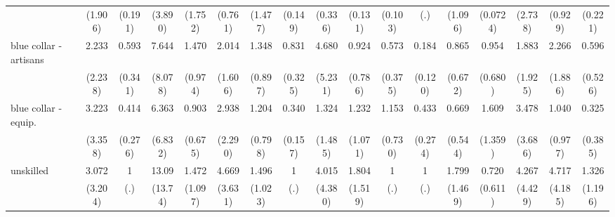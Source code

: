 {\begin{tabular}{l*{16}{c}}
                    &     (1.906)         &     (0.191)         &     (3.890)         &     (1.752)         &     (0.761)         &     (1.477)         &     (0.149)         &     (0.336)         &     (0.131)         &     (0.103)         &         (.)         &     (1.096)         &    (0.0724)         &     (2.738)         &     (0.929)         &     (0.221)         \\
[1em]
blue collar - artisans&       2.233         &       0.593         &       7.644         &       1.470         &       2.014         &       1.348         &       0.831         &       4.680         &       0.924         &       0.573         &       0.184\sym{**} &       0.865         &       0.954         &       1.883         &       2.266         &       0.596         \\
                    &     (2.238)         &     (0.341)         &     (8.078)         &     (0.974)         &     (1.606)         &     (0.897)         &     (0.325)         &     (5.231)         &     (0.786)         &     (0.375)         &     (0.120)         &     (0.672)         &     (0.680)         &     (1.925)         &     (1.886)         &     (0.526)         \\
[1em]
blue collar - equip.&       3.223         &       0.414         &       6.363         &       0.903         &       2.938         &       1.204         &       0.340\sym{*}  &       1.324         &       1.232         &       1.153         &       0.433         &       0.669         &       1.609         &       3.478         &       1.040         &       0.325         \\
                    &     (3.358)         &     (0.276)         &     (6.832)         &     (0.675)         &     (2.290)         &     (0.798)         &     (0.157)         &     (1.485)         &     (1.071)         &     (0.730)         &     (0.274)         &     (0.544)         &     (1.359)         &     (3.686)         &     (0.977)         &     (0.385)         \\
[1em]
unskilled           &       3.072         &           1         &       13.09\sym{*}  &       1.472         &       4.669\sym{*}  &       1.496         &           1         &       4.015         &       1.804         &           1         &           1         &       1.799         &       0.720         &       4.267         &       4.717         &       1.326         \\
                    &     (3.204)         &         (.)         &     (13.74)         &     (1.097)         &     (3.631)         &     (1.023)         &         (.)         &     (4.380)         &     (1.519)         &         (.)         &         (.)         &     (1.469)         &     (0.611)         &     (4.429)         &     (4.185)         &     (1.196)         \\

\end{tabular}}
